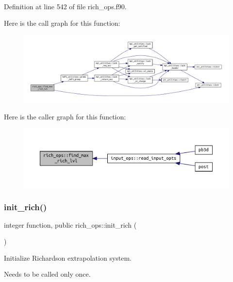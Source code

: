 Definition at line 542 of file rich\+\_\+ops.\+f90.

Here is the call graph for this function\+:\nopagebreak
\begin{figure}[H]
\begin{center}
\leavevmode
\includegraphics[width=350pt]{namespacerich__ops_a58e1bed1bed5c2d0b91cc7dc5e3099d9_cgraph}
\end{center}
\end{figure}
Here is the caller graph for this function\+:\nopagebreak
\begin{figure}[H]
\begin{center}
\leavevmode
\includegraphics[width=350pt]{namespacerich__ops_a58e1bed1bed5c2d0b91cc7dc5e3099d9_icgraph}
\end{center}
\end{figure}
\mbox{\label{namespacerich__ops_a9fbbda93eab8973d33063e277c489e7b}} 
\subsubsection{\texorpdfstring{init\+\_\+rich()}{init\_rich()}}
{\footnotesize\ttfamily integer function, public rich\+\_\+ops\+::init\+\_\+rich (\begin{DoxyParamCaption}{ }\end{DoxyParamCaption})}



Initialize Richardson extrapolation system. 

Needs to be called only once.

